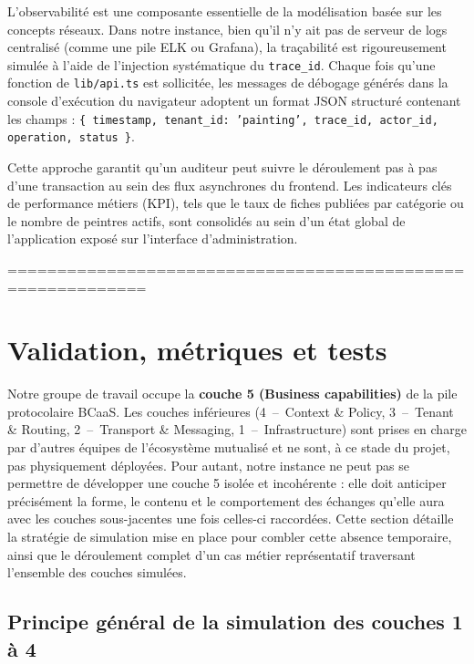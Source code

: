 \documentclass[12pt,a4paper]{report}
\begin{document}
L'observabilité est une composante essentielle de la modélisation basée sur les concepts réseaux. Dans notre instance, bien qu'il n'y ait pas de serveur de logs centralisé (comme une pile ELK ou Grafana), la traçabilité est rigoureusement simulée à l'aide de l'injection systématique du \texttt{trace\_id}. Chaque fois qu'une fonction de \texttt{lib/api.ts} est sollicitée, les messages de débogage générés dans la console d'exécution du navigateur adoptent un format JSON structuré contenant les champs : \texttt{\{ timestamp, tenant\_id: 'painting', trace\_id, actor\_id, operation, status \}}.

Cette approche garantit qu'un auditeur peut suivre le déroulement pas à pas d'une transaction au sein des flux asynchrones du frontend. Les indicateurs clés de performance métiers (KPI), tels que le taux de fiches publiées par catégorie ou le nombre de peintres actifs, sont consolidés au sein d'un état global de l'application exposé sur l'interface d'administration.

============================================================
\newpage
\section{Validation, métriques et tests}

Notre groupe de travail occupe la \textbf{couche 5 (Business capabilities)} de la pile protocolaire BCaaS. Les couches inférieures (4~--~Context \& Policy, 3~--~Tenant \& Routing, 2~--~Transport \& Messaging, 1~--~Infrastructure) sont prises en charge par d'autres équipes de l'écosystème mutualisé et ne sont, à ce stade du projet, pas physiquement déployées. Pour autant, notre instance ne peut pas se permettre de développer une couche 5 isolée et incohérente : elle doit anticiper précisément la forme, le contenu et le comportement des échanges qu'elle aura avec les couches sous-jacentes une fois celles-ci raccordées. Cette section détaille la stratégie de simulation mise en place pour combler cette absence temporaire, ainsi que le déroulement complet d'un cas métier représentatif traversant l'ensemble des couches simulées.

\subsection{Principe général de la simulation des couches 1 à 4}
\end{document}
